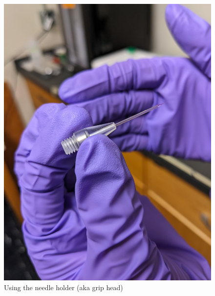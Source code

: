 \documentclass[
  letterpaper,
  DIV=11,
  numbers=noendperiod]{scrartcl}
\begin{document}
\begin{figure}
\begin{minipage}[t]{0.50\linewidth}
{{\includegraphics{micro_photos/included/needle_holder2.jpg}

}

}

\end{minipage}%

\caption{\label{fig-eggs}Using the needle holder (aka grip head)}

\end{figure}
\end{document}
